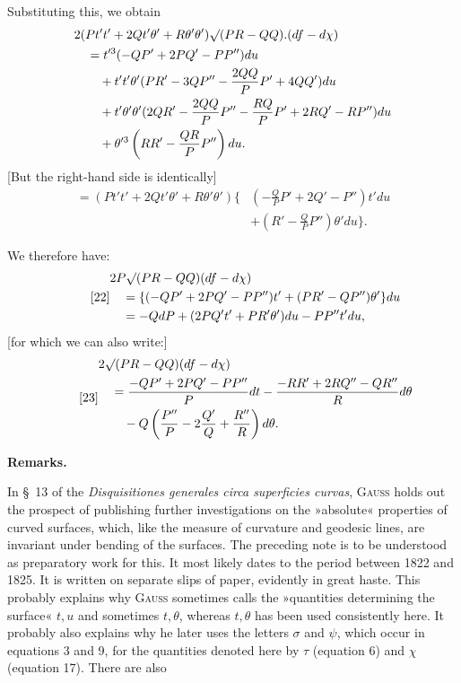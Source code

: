 %
\noindent Substituting this, we obtain
\[
\begin{aligned}
&2(Pt't'+2Qt'\theta'+R\theta'\theta')\mathord{\surd}(PR-QQ).(df-d\chi)\\
&\quad=t'^3(-QP'+2PQ'-PP'')du\\
&\qquad+t't'\theta'(PR'-3QP''-\frac{2QQ}{P}P'+4QQ')du\\
&\qquad+t'\theta'\theta'(2QR'-\frac{2QQ}{P}P''-\frac{RQ}{P}P'+2RQ'-RP'')du\\
&\qquad+\theta'^3\left(RR'-\frac{QR}{P}P''\right)du.
\end{aligned}
\]
[But the right-hand side is identically]
\[
\begin{aligned}
=(Pt't'+2Qt'\theta'+R\theta'\theta')\{&\left(-\frac QP P'+2Q'-P''\right)t'du\\
&+\left(R'-\frac QP P''\right)\theta'du\}.
\end{aligned}
\]

We therefore have:
\begin{equation}\tag*{[22]}
\begin{aligned}
&2P\mathord{\surd}(PR-QQ)(df-d\chi)\\
&\quad=\{(-QP'+2PQ'-PP'')t'+(PR'-QP'')\theta'\}du\\
&\quad=-QdP+(2PQ't'+PR'\theta')du-PP''t'du,
\end{aligned}
\end{equation}
[for which we can also write:]
\begin{equation}\tag*{[23]}
\begin{aligned}
&2\mathord{\surd}(PR-QQ)(df-d\chi)\\
&\quad=\frac{-QP'+2PQ'-PP''}{P}dt-\frac{-RR'+2RQ''-QR''}{R}d\theta\\
&\qquad-Q\left(\frac{P''}{P}-2\frac{Q'}{Q}+\frac{R''}{R}\right)d\theta.
\end{aligned}
\end{equation}
\begin{center}\bfseries Remarks.\end{center}
\noindent\hspace*{1.2em}In \S\ 13 of the \textit{Disquisitiones generales circa superficies curvas}, \textsc{Gauss} holds out the prospect of publishing further investigations on the »absolute« properties of curved surfaces, which, like the measure of curvature and geodesic lines, are invariant under bending of the surfaces. The preceding note is to be understood as preparatory work for this. It most likely dates to the period between 1822 and 1825. It is written on separate slips of paper, evidently in great haste. This probably explains why \textsc{Gauss} sometimes calls the »quantities determining the surface« $t,u$ and sometimes $t,\theta$, whereas $t,\theta$ has been used consistently here. It probably also explains why he later uses the letters $\sigma$ and $\psi$, which occur in equations 3 and 9, for the quantities denoted here by $\tau$ (equation 6) and $\chi$ (equation 17). There are also
